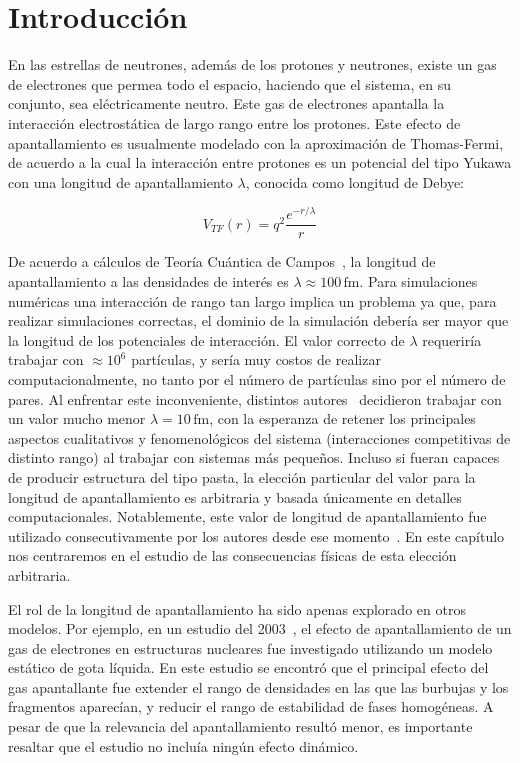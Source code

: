 \section{Introducción}

En las estrellas de neutrones, además de los protones y neutrones, existe un gas de electrones que permea todo el espacio, haciendo que el sistema, en su conjunto, sea eléctricamente neutro.
Este gas de electrones apantalla la interacción electrostática de largo rango entre los protones.
Este efecto de apantallamiento es usualmente modelado con la aproximación de Thomas-Fermi, de acuerdo a la cual la interacción entre protones es un potencial del tipo Yukawa con una longitud de apantallamiento $\lambda$, conocida como longitud de Debye:

\begin{equation*}
 V_{TF}(r) = q^2\frac{e^{-r/\lambda}}{r}
\end{equation*}

De acuerdo a cálculos de Teoría Cuántica de Campos~\cite[pp. 175-180]{fetter_quantum_2003}, la longitud de apantallamiento a las densidades de interés es $\lambda\approx100\,\text{fm}$. 
Para simulaciones numéricas una interacción de rango tan largo implica un problema ya que, para realizar simulaciones correctas, el dominio de la simulación debería ser mayor que la longitud de los potenciales de interacción.
El valor correcto de $\lambda$ requeriría trabajar con $\approx 10^6$ partículas, y sería muy costos de realizar computacionalmente, no tanto por el número de partículas sino por el número de pares.
Al enfrentar este inconveniente, distintos autores~\cite{maruyama_molecular_2012, horowitz_neutrino-pasta_2004} decidieron trabajar con un valor mucho menor $\lambda=10\,\text{fm}$, con la esperanza de retener los principales aspectos cualitativos y fenomenológicos del sistema (interacciones competitivas de distinto rango) al trabajar con sistemas más pequeños.
Incluso si fueran capaces de producir estructura del tipo pasta, la elección particular del valor para la longitud de apantallamiento es arbitraria y basada únicamente en detalles computacionales.
Notablemente, este valor de longitud de apantallamiento fue utilizado
consecutivamente por los autores desde ese momento~\cite{maruyama_quantum_1998, horowitz_neutrino-pasta_2004, dorso_topological_2012}.
En este capítulo nos centraremos en el estudio de las consecuencias físicas de esta elección arbitraria.

El rol de la longitud de apantallamiento ha sido apenas explorado en otros modelos.
Por ejemplo, en un estudio del 2003~\cite{watanabe_electron_2003}, el efecto de apantallamiento de un gas de electrones en estructuras nucleares fue investigado utilizando un modelo estático de gota líquida.
En este estudio se encontró que el principal efecto del gas apantallante fue extender el rango de densidades en las que las burbujas y los fragmentos aparecían, y reducir el rango de estabilidad de fases homogéneas.
A pesar de que la relevancia del apantallamiento resultó menor, es importante resaltar que el estudio no incluía ningún efecto dinámico.

